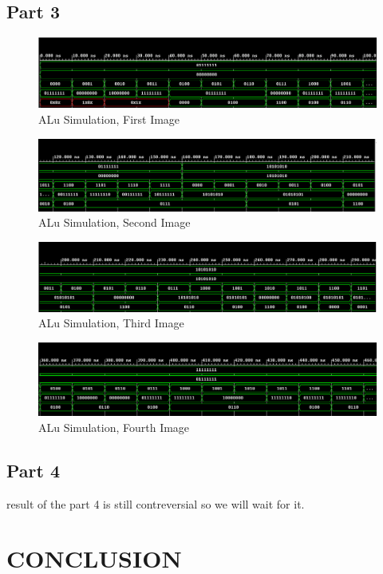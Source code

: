\documentclass[pdftex,12pt,a4paper]{article}
\begin{document}
\subsection{Part 3}
\begin{figure}[H]
	\centering
	\includegraphics[width=1\textwidth]{results/alu_1.png}	
	\caption{ALu Simulation, First Image}
	\label{ALU Simulation 1}
\end{figure}
\begin{figure}[H]
	\centering
	\includegraphics[width=1\textwidth]{results/alu_2.png}	
	\caption{ALu Simulation, Second Image}
	\label{ALU Simulation 2}
\end{figure}
\begin{figure}[H]
	\centering
	\includegraphics[width=1\textwidth]{results/alu_3.png}	
	\caption{ALu Simulation, Third Image}
	\label{ALU Simulation 3}
\end{figure}
\begin{figure}[H]
	\centering
	\includegraphics[width=1\textwidth]{results/alu_4.png}	
	\caption{ALu Simulation, Fourth Image}
	\label{ALU Simulation 4}
\end{figure}

\subsection{Part 4}
result of the part 4 is still contreversial so we will wait for it.


\section{CONCLUSION}
\end{document}
